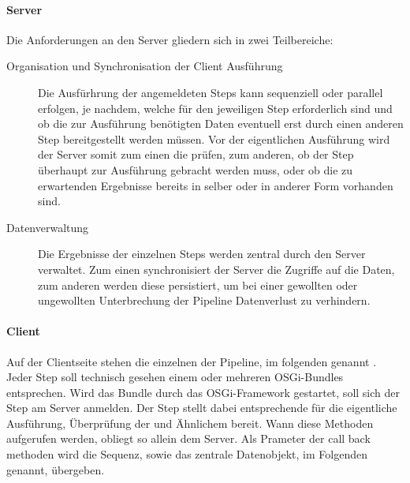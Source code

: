 \paragraph{Server}
Die Anforderungen an den Server gliedern sich in zwei Teilbereiche:
\begin{description}
\item[Organisation und Synchronisation der Client Ausführung]
Die Ausfürhrung der angemeldeten Steps kann sequenziell oder
parallel erfolgen, je nachdem, welche  für den
jeweiligen Step erforderlich sind und ob die zur Ausführung benötigten Daten eventuell erst
durch einen anderen Step bereitgestellt werden müssen. Vor der eigentlichen
Ausführung wird der Server somit zum einen die 
prüfen, zum anderen, ob der Step überhaupt zur Ausführung
gebracht werden muss, oder ob die zu erwartenden Ergebnisse bereits in selber
oder in anderer Form vorhanden sind.
\item[Datenverwaltung] Die Ergebnisse der einzelnen Steps werden zentral durch
den Server verwaltet.
Zum einen synchronisiert der Server die Zugriffe auf die Daten, zum anderen
werden diese persistiert, um bei einer gewollten oder ungewollten Unterbrechung
der Pipeline Datenverlust zu verhindern.
\end{description}

\paragraph{Client}
Auf der Clientseite stehen die einzelnen  der Pipeline, im
folgenden  genannt . Jeder Step soll technisch
gesehen einem oder mehreren OSGi-Bundles entsprechen.
Wird das Bundle durch das OSGi-Framework gestartet, soll sich der Step am Server
anmelden. Der Step stellt dabei entsprechende  für die
eigentliche Ausführung, Überprüfung der  und
Ähnlichem bereit.
Wann diese Methoden aufgerufen werden, obliegt so allein
dem Server.
Als Prameter der call back methoden wird die Sequenz, sowie das zentrale
Datenobjekt, im Folgenden   genannt,
übergeben.

